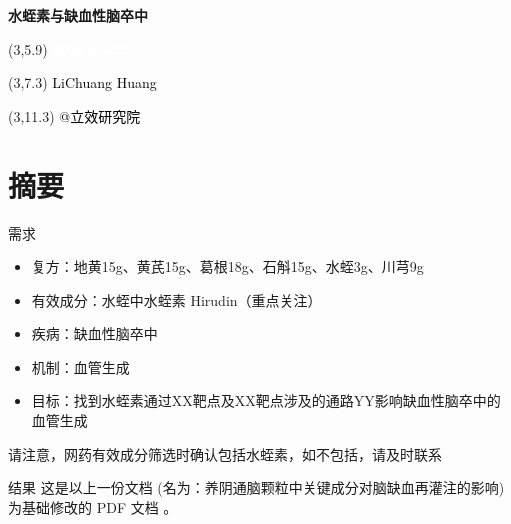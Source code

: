 \documentclass[
  ignorenonframetext,
]{beamer}
\author{}
\date{\vspace{-2.5em}}
\providecommand{\tightlist}{%
  \setlength{\itemsep}{0pt}\setlength{\parskip}{0pt}}
\begin{document}
\begin{frame}
\begin{titlepage} 
\begin{center} \textbf{\Huge
水蛭素与缺血性脑卒中} \vspace{4em}
\begin{textblock}{10}(3,5.9) \huge
\textbf{\textcolor{white}{2024-04-22}}
\end{textblock} \begin{textblock}{10}(3,7.3)
\Large \textcolor{black}{LiChuang Huang}
\end{textblock} \begin{textblock}{10}(3,11.3)
\Large \textcolor{black}{@立效研究院}
\end{textblock} \end{center} \end{titlepage}
\restoregeometry


\tableofcontents

\listoffigures

\listoftables



\end{frame}

\hypertarget{abstract}{%
\section{摘要}\label{abstract}}

\begin{frame}{需求}
\protect\hypertarget{ux9700ux6c42}{}
\begin{itemize}
\tightlist
\item
  复方：地黄15g、黄芪15g、葛根18g、石斛15g、水蛭3g、川芎9g
\item
  有效成分：水蛭中水蛭素 Hirudin（重点关注）
\item
  疾病：缺血性脑卒中
\item
  机制：血管生成
\item
  目标：找到水蛭素通过XX靶点及XX靶点涉及的通路YY影响缺血性脑卒中的血管生成
\end{itemize}

请注意，网药有效成分筛选时确认包括水蛭素，如不包括，请及时联系
\end{frame}

\begin{frame}{结果}
\protect\hypertarget{ux7ed3ux679c}{}
这是以上一份文档 (名为：养阴通脑颗粒中关键成分对脑缺血再灌注的影响)
为基础修改的 PDF 文档 。
\end{frame}
\end{document}
